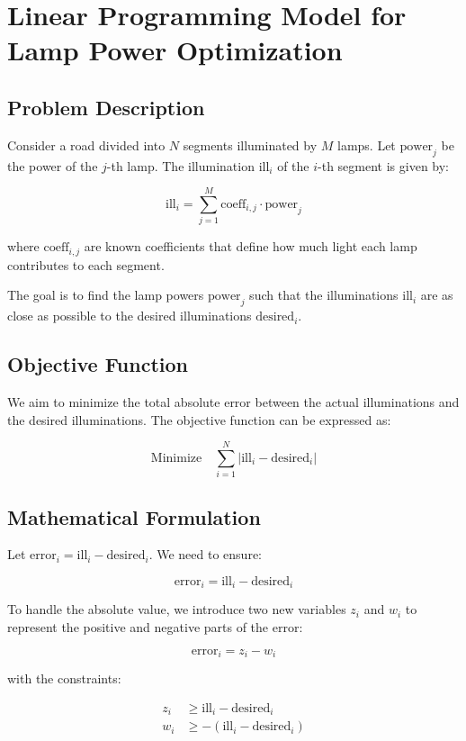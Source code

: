 \documentclass{article}
\begin{document}
\section*{Linear Programming Model for Lamp Power Optimization}

\subsection*{Problem Description}

Consider a road divided into \( N \) segments illuminated by \( M \) lamps. Let \( \text{power}_j \) be the power of the \( j \)-th lamp. The illumination \( \text{ill}_i \) of the \( i \)-th segment is given by:

\[
\text{ill}_i = \sum_{j=1}^{M} \text{coeff}_{i,j} \cdot \text{power}_j
\]

where \( \text{coeff}_{i,j} \) are known coefficients that define how much light each lamp contributes to each segment.

The goal is to find the lamp powers \( \text{power}_j \) such that the illuminations \( \text{ill}_i \) are as close as possible to the desired illuminations \( \text{desired}_i \).

\subsection*{Objective Function}

We aim to minimize the total absolute error between the actual illuminations and the desired illuminations. The objective function can be expressed as:

\[
\text{Minimize} \quad \sum_{i=1}^{N} \left| \text{ill}_i - \text{desired}_i \right|
\]

\subsection*{Mathematical Formulation}

Let \( \text{error}_i = \text{ill}_i - \text{desired}_i \). We need to ensure:

\[
\text{error}_i = \text{ill}_i - \text{desired}_i
\]

To handle the absolute value, we introduce two new variables \( z_i \) and \( w_i \) to represent the positive and negative parts of the error:

\[
\text{error}_i = z_i - w_i
\]

with the constraints:

\[
\begin{align*}
z_i & \geq \text{ill}_i - \text{desired}_i \\
w_i & \geq -(\text{ill}_i - \text{desired}_i)
\end{align*}
\]
\end{document}
